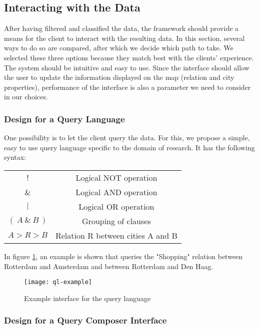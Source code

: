 \subsection{Interacting with the Data}
After having filtered and classified the data, the framework should provide a means for the client to interact with the resulting data. In this section, several ways to do so are compared, after which we decide which path to take. We selected these three options because they match best with the clients' experience. The system should be intuitive and easy to use. Since the interface should allow the user to update the information displayed on the map (relation and city properties), performance of the interface is also a parameter we need to consider in our choices.  

\subsubsection{Design for a Query Language}

One possibility is to let the client query the data. For this, we propose a simple, easy to use query language specific to the domain of research. It has the following syntax:

\begin{center}
\begin{tabular}{ |c|c| } 
 \hline
 ! & Logical NOT operation \\
 \& & Logical AND operation \\ 
 $|$ & Logical OR operation \\ 
 $(~A~\&~B~)$ & Grouping of clauses \\
 $A > R > B$ & Relation R between cities A and B \\
 \hline
\end{tabular}
\end{center}

In figure \ref{fig:ql-example}, an example is shown that queries the "Shopping" relation between Rotterdam and Amsterdam and between Rotterdam and Den Haag.

\begin{figure}[ht]
\centering
\texttt{[image: ql-example]}
\caption{Example interface for the query language}
\label{fig:ql-example}
\end{figure}

\subsubsection{Design for a Query Composer Interface}

